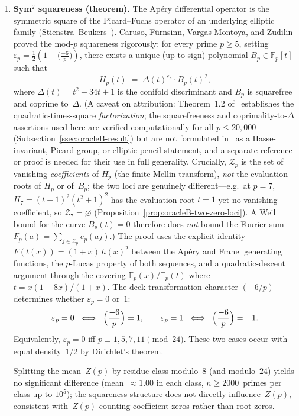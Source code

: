 \documentclass[11pt]{article}
\theoremstyle{definition}
\theoremstyle{remark}
\begin{document}
\begin{enumerate}
\item \textbf{Sym$^2$ squareness
(theorem).}\label{rem:squareness}
The Ap\'ery differential operator is the symmetric
square of the Picard--Fuchs operator of an
underlying elliptic family (Stienstra--Beukers~\cite{SB1985}).
Caruso, F\"urnsinn, Vargas-Montoya, and
Zudilin~\cite{CFVZ2026} proved the mod-$p$
squareness rigorously: for every prime $p \ge 5$,
setting $\varepsilon_p = \frac{1}{2}(1 - \bigl(\frac{-6}{p}\bigr))$,
there exists a unique (up to sign) polynomial
$B_p \in \mathbb{F}_p[t]$ such that
\[
  H_p(t) \;=\; \Delta(t)^{\varepsilon_p}\cdot B_p(t)^2,
\]
where $\Delta(t) = t^2 - 34t + 1$ is the
conifold discriminant and
$B_p$ is squarefree and coprime to~$\Delta$.
(A caveat on attribution: Theorem~1.2
of~\cite{CFVZ2026} establishes the
quadratic-times-square \emph{factorization};
the squarefreeness and coprimality-to-$\Delta$
assertions used here are verified computationally
for all $p \le 20{,}000$
(Subsection~\ref{ssec:oracleB-result}) but are not
formulated in~\cite{CFVZ2026} as a Hasse-invariant,
Picard-group, or elliptic-pencil statement, and a
separate reference or proof is needed for their use
in full generality.
Crucially, $\mathcal{Z}_p$ is the set of vanishing
\emph{coefficients} of $H_p$
(the finite Mellin transform), \emph{not} the
evaluation roots of $H_p$ or of~$B_p$; the two loci
are genuinely different---e.g.\ at $p = 7$,
$H_7 = (t{-}1)^2(t^2{+}1)^2$ has the evaluation root
$t = 1$ yet no vanishing coefficient, so
$\mathcal{Z}_7 = \varnothing$
(Proposition~\ref{prop:oracleB-two-zero-loci}).
A Weil bound for the curve $B_p(t) = 0$ therefore
does \emph{not} bound the Fourier sum
$F_p(a) = \sum_{j \in \mathcal{Z}_p} e_p(aj)$.)
The proof uses the explicit identity
$F(t(x)) = (1+x)\,h(x)^2$ between the Ap\'ery
and Franel generating functions, the $p$-Lucas
property of both sequences, and a quadratic-descent
argument through the covering
$\mathbb{F}_p(x)/\mathbb{F}_p(t)$ where
$t = x(1-8x)/(1+x)$.
The deck-transformation character $(-6/p)$ determines
whether $\varepsilon_p = 0$ or~$1$:
\[
  \varepsilon_p = 0 \;\iff\;
  \Bigl(\frac{-6}{p}\Bigr) = 1,
  \qquad
  \varepsilon_p = 1 \;\iff\;
  \Bigl(\frac{-6}{p}\Bigr) = -1.
\]
Equivalently, $\varepsilon_p = 0$ iff
$p \equiv 1, 5, 7, 11 \pmod{24}$.
These two cases occur with equal density~$1/2$
by Dirichlet's theorem.

Splitting the mean~$Z(p)$ by residue
class modulo~$8$ (and modulo~$24$)
yields no significant difference
(mean~$\approx 1.00$ in each class,
$n \ge 2000$~primes per class up to $10^5$);
the squareness structure does not
directly influence~$Z(p)$,
consistent with~$Z(p)$ counting coefficient
zeros rather than root zeros.


\end{enumerate}
\end{document}
